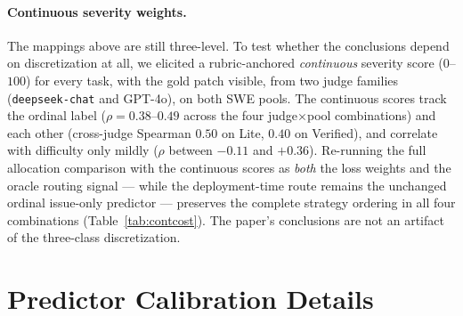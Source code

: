 \documentclass{article}
\begin{document}
\paragraph{Continuous severity weights.} The mappings above are still
three-level. To test whether the conclusions depend on discretization
at all, we elicited a rubric-anchored \emph{continuous} severity score
($0$--$100$) for every task, with the gold patch visible, from two
judge families (\texttt{deepseek-chat} and GPT-4o), on both SWE
pools. The continuous scores track the ordinal label
($\rho = 0.38$--$0.49$ across the four judge$\times$pool
combinations) and each other (cross-judge Spearman $0.50$ on Lite,
$0.40$ on Verified), and correlate with difficulty only mildly
($\rho$ between $-0.11$ and $+0.36$). Re-running the full allocation
comparison with the continuous scores as \emph{both} the loss weights
and the oracle routing signal --- while the deployment-time route
remains the unchanged ordinal issue-only predictor --- preserves the
complete strategy ordering in all four combinations
(Table~\ref{tab:contcost}). The paper's conclusions are not an
artifact of the three-class discretization.

\begin{table}[h]
\centering
\caption{\textbf{Allocation under continuous $0$--$100$ severity
weights} from two independent judge families, both pools
(reduction vs.\ difficulty-aware routing; deployment route = ordinal
issue-only predictor throughout). The discrete-table ordering is
preserved in every combination.}
\label{tab:contcost}
\small
{}
\end{table}

\section{Predictor Calibration Details}
\label{app:predictor}
\end{document}
